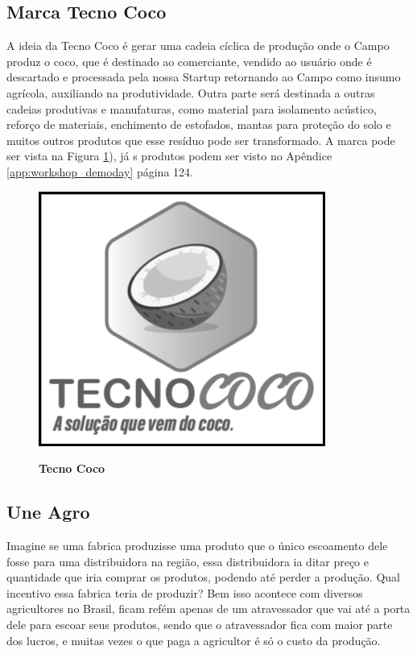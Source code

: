 \subsection{Marca Tecno Coco}

A ideia da Tecno Coco é gerar uma cadeia cíclica de produção onde o Campo produz o coco, que é destinado ao comerciante, vendido ao usuário onde é descartado e processada pela nossa Startup retornando ao Campo como insumo agrícola, auxiliando na produtividade. Outra parte será destinada a outras cadeias produtivas e manufaturas, como material para isolamento acústico, reforço de materiais, enchimento de estofados, mantas para proteção do solo e muitos outros produtos que esse resíduo pode ser transformado. A marca pode ser vista na Figura \ref{figura_50}), já s produtos podem ser visto no Apêndice \ref{app:workshop_demoday} página 124.


\begin{figure}[H]
\centering
\caption{\textbf{Tecno Coco}}
\includegraphics[scale=0.45]{Imagens/tecnococo.png}
\label{figura_50}
\end{figure}


\subsection{Une Agro}

Imagine se uma fabrica produzisse uma produto que o único escoamento dele fosse para uma distribuidora na região, essa distribuidora ia ditar preço e quantidade que iria comprar os produtos, podendo até perder a produção. Qual incentivo essa fabrica teria de produzir? Bem isso acontece com diversos agricultores no Brasil, ficam refém apenas de um atravessador que vai até a porta dele para escoar seus produtos, sendo que o atravessador fica com maior parte dos lucros, e muitas vezes o que paga a agricultor é só o custo da produção.


